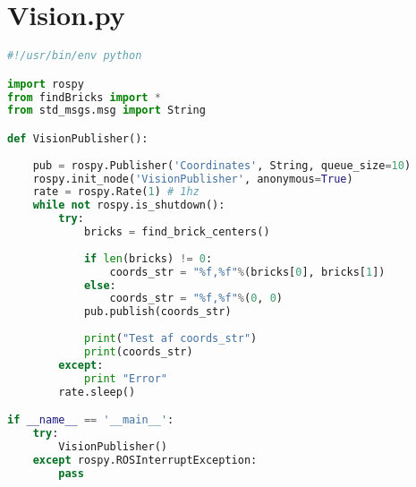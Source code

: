 \section{Vision.py}\label{sec:VisionNode}
\begin{lstlisting}[language=Python]
#!/usr/bin/env python

import rospy
from findBricks import *
from std_msgs.msg import String

def VisionPublisher():
    
    pub = rospy.Publisher('Coordinates', String, queue_size=10)
    rospy.init_node('VisionPublisher', anonymous=True)
    rate = rospy.Rate(1) # 1hz
    while not rospy.is_shutdown():
        try:
            bricks = find_brick_centers()
            
            if len(bricks) != 0:        
                coords_str = "%f,%f"%(bricks[0], bricks[1])
            else:
                coords_str = "%f,%f"%(0, 0)          
            pub.publish(coords_str)
            
            print("Test af coords_str")
            print(coords_str)
        except:
            print "Error"
        rate.sleep()

if __name__ == '__main__':
    try:
        VisionPublisher()
    except rospy.ROSInterruptException:
        pass
\end{lstlisting}

\newpage
